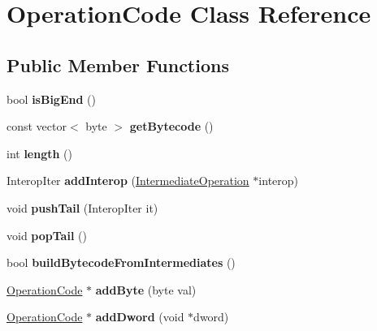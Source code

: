 \hypertarget{a00015}{\section{Operation\+Code Class Reference}
\label{a00015}
}
\subsection*{Public Member Functions}
\begin{DoxyCompactItemize}
\item 
\hypertarget{a00015_ac0f1c51ea1fb3dca7c12df8b40a3a9fc}{bool {\bfseries is\+Big\+End} ()}\label{a00015_ac0f1c51ea1fb3dca7c12df8b40a3a9fc}

\item 
\hypertarget{a00015_aea26ab3a3870c339f645fcf08393d7ff}{const vector$<$ byte $>$ {\bfseries get\+Bytecode} ()}\label{a00015_aea26ab3a3870c339f645fcf08393d7ff}

\item 
\hypertarget{a00015_a86ecde320164c35c4bbfde1d84004382}{int {\bfseries length} ()}\label{a00015_a86ecde320164c35c4bbfde1d84004382}

\item 
\hypertarget{a00015_aa677fbb79b000236e51cb58f8914efdd}{Interop\+Iter {\bfseries add\+Interop} (\hyperlink{a00014}{Intermediate\+Operation} $\ast$interop)}\label{a00015_aa677fbb79b000236e51cb58f8914efdd}

\item 
\hypertarget{a00015_af582b3766d98cb4dc03b52715b4245ab}{void {\bfseries push\+Tail} (Interop\+Iter it)}\label{a00015_af582b3766d98cb4dc03b52715b4245ab}

\item 
\hypertarget{a00015_a851082a0d4198802422289c3a9fa6c2e}{void {\bfseries pop\+Tail} ()}\label{a00015_a851082a0d4198802422289c3a9fa6c2e}

\item 
\hypertarget{a00015_ac4933dc30cf05ea38c1ba362d716fbcc}{bool {\bfseries build\+Bytecode\+From\+Intermediates} ()}\label{a00015_ac4933dc30cf05ea38c1ba362d716fbcc}

\item 
\hypertarget{a00015_ad3fd8287bebf2b2ce10268afd294fa0c}{\hyperlink{a00015}{Operation\+Code} $\ast$ {\bfseries add\+Byte} (byte val)}\label{a00015_ad3fd8287bebf2b2ce10268afd294fa0c}

\item 
\hypertarget{a00015_a454dad1134c629f0611f81bf10c62423}{\hyperlink{a00015}{Operation\+Code} $\ast$ {\bfseries add\+Dword} (void $\ast$dword)}\label{a00015_a454dad1134c629f0611f81bf10c62423}


\end{DoxyCompactItemize}
